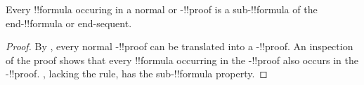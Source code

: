 \documentclass[../../../include/open-logic-section]{subfiles}
\begin{document}
\begin{cor}
Every !!{formula} occuring in a normal  or
-!!{proof} is a sub-!!{formula} of the end-!!{formula} or
end-sequent.
\end{cor}

\begin{proof}
  By , every normal -!!{proof}
  can be translated into a -!!{proof}. An inspection of the proof
  shows that every !!{formula} occurring in the -!!{proof}
  also occurs in the -!!{proof}. , lacking the
  \Cut{} rule, has the sub-!!{formula} property.
\end{proof}
\end{document}
